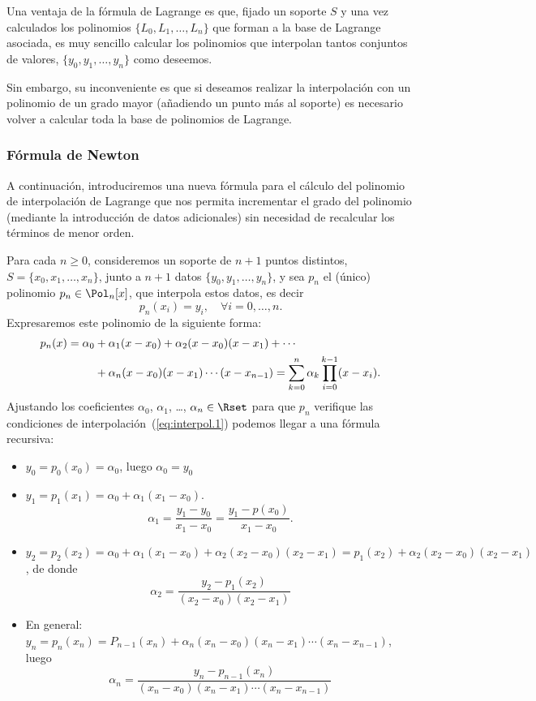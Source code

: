 \begin{remark}
  Una ventaja de la fórmula de Lagrange es que, fijado un soporte $S$
  y una vez calculados los polinomios $\{L_0,L_1,\dots, L_n\}$ que
  forman a la base de Lagrange asociada, es muy sencillo calcular los
  polinomios que interpolan tantos conjuntos de valores,
  $\{y_0,y_1,\dots,y_n\}$ como deseemos.

  Sin embargo, su inconveniente es que si deseamos realizar la
  interpolación con un polinomio de un grado mayor (añadiendo un punto
  más al soporte) es necesario volver a calcular toda la base de
  polinomios de Lagrange.
\end{remark}

\subsubsection{Fórmula de Newton}
\label{sec:formula-de-newton}
A continuación, introduciremos una nueva fórmula para el cálculo del polinomio de interpolación de Lagrange que nos permita incrementar el grado del polinomio (mediante la introducción de datos adicionales) sin necesidad de recalcular los términos de menor orden.

Para cada $n\ge 0$, consideremos un soporte de $n+1$ puntos distintos,
$S=\{x_0,x_1,\dots,x_n\}$, junto a $n+1$
datos $\{y_0,y_1,\dots,y_n\}$, y sea $p_n$ el (único) polinomio
$p_n \in \Pol_n[x]$, que interpola estos datos, es
decir
\begin{equation}
  p_n(x_i)=y_i, \quad \forall i=0,\dots,n.
  \label{eq:interpol.1}
\end{equation}
Expresaremos este polinomio de la siguiente forma:
\begin{align}
  \notag
  p_n(x)=\alpha_0 &+ \alpha_1 (x-x_0) + \alpha_2(x-x_0)(x-x_1) + \cdots
          \\
  &+ \alpha_n(x-x_0)(x-x_1)\cdots(x-x_{n-1})
        =\sum_{k=0}^n \alpha_k \prod_{i=0}^{k-1}(x-x_i).
          \label{eq:pol.newton.dif-div}
\end{align}
Ajustando los coeficientes $\alpha_0$, $\alpha_1$, \dots,
$\alpha_n\in\Rset$ para que $p_n$ verifique las condiciones de
interpolación~(\ref{eq:interpol.1}) podemos llegar a una fórmula recursiva:
\begin{itemize}
\item $y_0=p_0(x_0)=\alpha_0$, luego $\alpha_0=y_0$
\item $y_1=p_1(x_1)=\alpha_0+\alpha_1(x_1-x_0)$.
  $$
  \alpha_1=\frac{y_1-y_0}{x_1-x_0} =
  \frac{y_1-p(x_0)}{x_1-x_0}.
  $$

\item $y_2=p_2(x_2)=\alpha_0+\alpha_1(x_1-x_0)+\alpha_2(x_2-x_0)(x_2-x_1)=p_1(x_2) +\alpha_2(x_2-x_0)(x_2-x_1)$, de donde
  $$
  \alpha_2= \frac{y_2-p_1(x_2)}{(x_2-x_0)(x_2-x_1)}
  $$

\item En general: $y_n=p_n(x_n)=P_{n-1}(x_n) + \alpha_n(x_n-x_0)(x_n-x_1)\cdots(x_n-x_{n-1})$, luego
  $$
  \alpha_n= \frac{y_n-p_{n-1}(x_n)}{(x_n-x_0)(x_n-x_1)\cdots(x_n-x_{n-1})}
  $$
\end{itemize}

